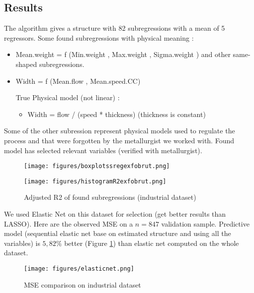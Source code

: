 \documentclass[11pt,a4paper]{article}
\begin{document}
	\subsection{Results}
		The algorithm gives a structure with 82 subregressions with a mean of 5 regressors.
			Some found subregressions with physical meaning :
			\begin{itemize}
				\item Mean.weight = f (Min.weight , Max.weight , Sigma.weight ) and other same-shaped subregressions.
				\item Width = f (Mean.flow , Mean.speed.CC)
				
True Physical model (not linear) :\begin{itemize}
\item Width = flow / (speed * thickness) (thickness is constant)
\end{itemize} 
			\end{itemize}
			
			Some of the other subression represent physical models used to regulate the process and that were forgotten by the metallurgist we worked with.
		Found model has selected relevant variables (verified with metallurgist).								
		
		
		\begin{figure}[hbtp]
		\begin{minipage}[c]{.40\linewidth}
			\texttt{[image: figures/boxplotssregexfobrut.png]}
   \end{minipage} \hfill
   \begin{minipage}[c]{.52\linewidth}
			\texttt{[image: figures/histogramR2exfobrut.png]}
   \end{minipage}
			\caption{Adjusted R2 of found subregressions (industrial dataset)}
			\centering
			\end{figure}
%		
%				
		
				We used Elastic Net\cite{zou2005regularization} on this dataset for selection (get better results than LASSO). Here are the observed MSE on a $n=847$ validation sample.
Predictive model (sequential elastic net base on estimated structure and using all the variables) is $5,82\%$ better (Figure \ref{compareMSEexfos}) than elastic net computed on the whole dataset.
		\begin{figure}[h]
						\centering
						\label{compareMSEexfos}
						\texttt{[image: figures/elasticnet.png]}
						\caption{MSE comparison on industrial dataset}
				\end{figure}						
		\clearpage
\end{document}
